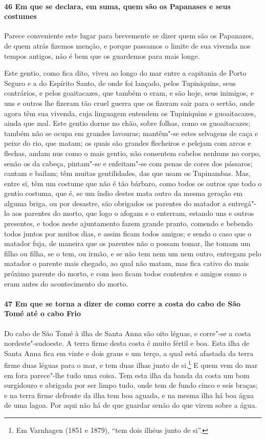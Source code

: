 \paragraph{46 Em que se declara, em suma, quem são os Papanases e seus costumes}

Parece conveniente este lugar para brevemente se dizer quem são os Papanazes, de quem
atrás fizemos menção, e porque passamos o limite de sua vivenda nos tempos antigos, não é
bem que os guardemos para mais longe.

Este gentio, como fica dito, viveu ao longo do mar entre a capitania de Porto Seguro e a
do Espírito Santo, de onde foi lançado, pelos Tupiniquins, seus contrários, e pelos
goaitacazes, que também o eram, e são hoje, seus inimigos, e uns e outros lhe fizeram tão
cruel guerra que os fizeram sair para o sertão, onde agora têm sua vivenda, cuja linguagem
entendem os Tupiniquins e guoaitacazes, ainda que mal. Este gentio dorme no chão, sobre
folhas, como os guoaitacazes; também não se ocupa em grandes lavouras; mantêm"-se estes
selvagens de caça e peixe do rio, que matam; os quais são grandes flecheiros e pelejam com
arcos e flechas, andam nus como o mais gentio, não consentem cabelos nenhuns no corpo,
senão os da cabeça, pintam"-se e enfeitam"-se com penas de cores dos pássaros; cantam e
bailam; têm muitas gentilidades, das que usam os Tupinambas. Mas, entre si, têm um costume
que não é tão bárbaro, como todos os outros que todo o gentio costuma, que é, se um índio
destes mata outro da mesma geração em alguma briga, ou por desastre, são obrigados os
parentes do matador a entregá"-lo aos parentes do morto, que logo o afogam e o enterram,
estando uns e outros presentes, e todos neste ajuntamento fazem grande pranto, comendo e
bebendo todos juntos por muitos dias, e assim ficam todos amigos; e sendo o caso que o
matador fuja, de maneira que os parentes não o possam tomar, lhe tomam um filho ou filha,
se o tem, ou irmão, e se não tem nem um nem outro, entregam pelo matador o parente mais
chegado, ao qual não matam, mas fica cativo do mais próximo parente do morto, e com isso
ficam todos contentes e amigos como o eram antes do acontecimento do morto.

\paragraph{47 Em que se torna a dizer de como corre a costa do cabo de São Tomé até o cabo
Frio}

Do cabo de São Tomé à ilha de Santa Anna são oito léguas, e corre"-se a costa
nordeste"-sudoeste. A terra firme desta costa é muito fértil e boa. Esta ilha de Santa Anna
fica em vinte e dois graus e um terço, a qual está afastada da terra firme duas léguas
para o mar, e tem duas ilhas junto de si.\footnote{ Em Varnhagen (1851 e 1879), ``tem dois
ilhéus junto de si''.} E quem vem do mar em fora parece"-lhe tudo uma coisa. Tem esta ilha
da banda da costa um bom surgidouro e abrigada por ser limpo tudo, onde tem de fundo cinco
e seis braças; e na terra firme defronte da ilha tem boa aguada, e na mesma ilha há boa
água de uma lagoa. Por aqui não há de que guardar senão do que virem sobre a água.


